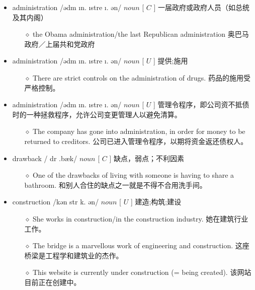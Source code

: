 \documentclass[a4paper,top=2.5cm,buttom=2.5cm10.5pt]{book}
\begin{document}
\begin{itemize}
\item administration /əd\textsecstress m \i n. \i  \textprimstress stre \i . \textesh ən/ $ noun $ [  $ C $  ] 一届政府或政府人员（如总统及其内阁）
\begin{itemize}
\item[$\diamond$] the Obama administration/the last Republican administration
奥巴马政府／上届共和党政府
\end{itemize}
\end{itemize}
\begin{itemize}
\item administration /əd\textsecstress m \i n. \i  \textprimstress stre \i . \textesh ən/ $ noun $ [  $ U $  ] 提供;施用
\begin{itemize}
\item[$\diamond$] There are strict controls on the administration of drugs.
药品的施用受严格控制。
\end{itemize}
\end{itemize}
\begin{itemize}
\item administration /əd\textsecstress m \i n. \i  \textprimstress stre \i . \textesh ən/ $ noun $ [  $ U $  ] 管理令程序，即公司资不抵债时的一种拯救程序，允许公司变更管理人以避免清算。
\begin{itemize}
\item[$\diamond$] The company has gone into administration, in order for money to be returned to creditors.
公司已进入管理令程序，以期将资金返还债权人。
\end{itemize}
\end{itemize}
\begin{itemize}
\item drawback / \textprimstress dr \textopeno  \textlengthmark .bæk/ $ noun $ [  $ C $  ] 缺点，弱点；不利因素
\begin{itemize}
\item[$\diamond$] One of the drawbacks of living with someone is having to share a bathroom.
和别人合住的缺点之一就是不得不合用洗手间。
\end{itemize}
\end{itemize}
\begin{itemize}
\item construction /kən \textprimstress str \textturnv k. \textesh ən/ $ noun $ [  $ U $  ] 建造;构筑;建设
\begin{itemize}
\item[$\diamond$] She works in construction/in the construction industry.
她在建筑行业工作。
\item[$\diamond$] The bridge is a marvellous work of engineering and construction.
这座桥梁是工程学和建筑业的杰作。
\item[$\diamond$] This website is currently under construction (= being created).
该网站目前正在创建中。
\end{itemize}
\end{itemize}
\end{document}
